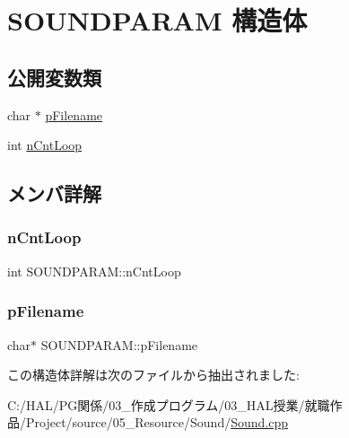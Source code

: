\hypertarget{struct_s_o_u_n_d_p_a_r_a_m}{}\section{S\+O\+U\+N\+D\+P\+A\+R\+AM 構造体}
\label{struct_s_o_u_n_d_p_a_r_a_m}
\subsection*{公開変数類}
\begin{DoxyCompactItemize}
\item 
char $\ast$ \mbox{\hyperlink{struct_s_o_u_n_d_p_a_r_a_m_a7e1fb1b63606df49ae9f1b0b7c6df85f}{p\+Filename}}
\item 
int \mbox{\hyperlink{struct_s_o_u_n_d_p_a_r_a_m_a3e150cf96706aae747ffa2fefe63d48e}{n\+Cnt\+Loop}}
\end{DoxyCompactItemize}


\subsection{メンバ詳解}
\mbox{\label{struct_s_o_u_n_d_p_a_r_a_m_a3e150cf96706aae747ffa2fefe63d48e}} 
\subsubsection{\texorpdfstring{n\+Cnt\+Loop}{nCntLoop}}
{\footnotesize\ttfamily int S\+O\+U\+N\+D\+P\+A\+R\+A\+M\+::n\+Cnt\+Loop}

\mbox{\label{struct_s_o_u_n_d_p_a_r_a_m_a7e1fb1b63606df49ae9f1b0b7c6df85f}} 
\subsubsection{\texorpdfstring{p\+Filename}{pFilename}}
{\footnotesize\ttfamily char$\ast$ S\+O\+U\+N\+D\+P\+A\+R\+A\+M\+::p\+Filename}



この構造体詳解は次のファイルから抽出されました\+:\begin{DoxyCompactItemize}
\item 
C\+:/\+H\+A\+L/\+P\+G関係/03\+\_\+作成プログラム/03\+\_\+\+H\+A\+L授業/就職作品/\+Project/source/05\+\_\+\+Resource/\+Sound/\mbox{\hyperlink{_sound_8cpp}{Sound.\+cpp}}\end{DoxyCompactItemize}
